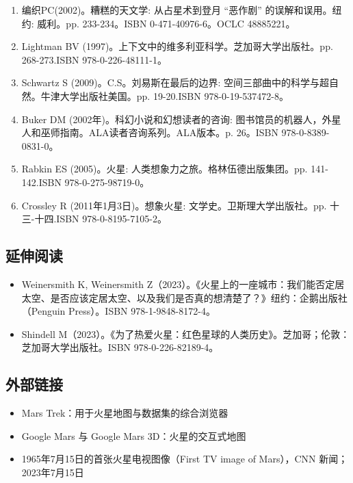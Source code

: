 \begin{enumerate}
\item 编织PC(2002)。糟糕的天文学: 从占星术到登月 “恶作剧” 的误解和误用。纽约: 威利。pp. 233-234。ISBN 0-471-40976-6。OCLC 48885221。
\item Lightman BV (1997)。上下文中的维多利亚科学。芝加哥大学出版社。pp. 268-273.ISBN 978-0-226-48111-1。
\item Schwartz S (2009)。C.S。刘易斯在最后的边界: 空间三部曲中的科学与超自然。牛津大学出版社美国。pp. 19-20.ISBN 978-0-19-537472-8。
\item Buker DM (2002年)。科幻小说和幻想读者的咨询: 图书馆员的机器人，外星人和巫师指南。ALA读者咨询系列。ALA版本。p. 26。ISBN 978-0-8389-0831-0。
\item Rabkin ES (2005)。火星: 人类想象力之旅。格林伍德出版集团。pp. 141-142.ISBN 978-0-275-98719-0。
\item Crossley R (2011年1月3日)。想象火星: 文学史。卫斯理大学出版社。pp. 十三-十四.ISBN 978-0-8195-7105-2。
\end{enumerate}
\subsection{延伸阅读}
\begin{itemize}
\item Weinersmith K, Weinersmith Z（2023）。《火星上的一座城市：我们能否定居太空、是否应该定居太空、以及我们是否真的想清楚了？》纽约：企鹅出版社（Penguin Press）。ISBN 978-1-9848-8172-4。
\item Shindell M（2023）。《为了热爱火星：红色星球的人类历史》。芝加哥；伦敦：芝加哥大学出版社。ISBN 978-0-226-82189-4。
\end{itemize}
\subsection{外部链接}
\begin{itemize}
\item Mars Trek：用于火星地图与数据集的综合浏览器
\item Google Mars 与 Google Mars 3D：火星的交互式地图
\item 1965年7月15日的首张火星电视图像（First TV image of Mars），CNN 新闻；2023年7月15日
\end{itemize}